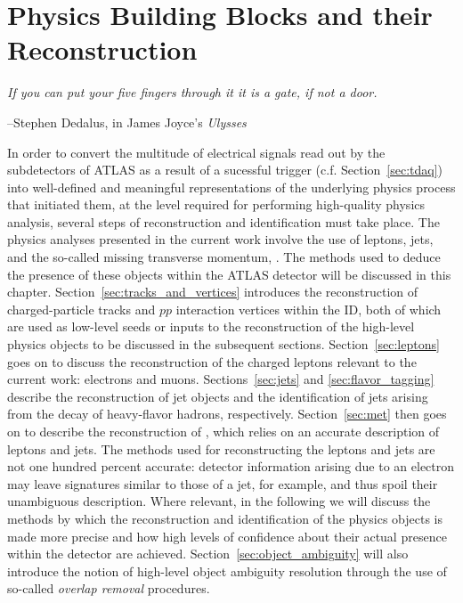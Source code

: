 \chapter{Physics Building Blocks and their Reconstruction}
\label{chap:objects}

\epigraph{\textit{If you can put your five fingers through it it is a gate, if not a door.}}{--Stephen Dedalus, in James Joyce's \textit{Ulysses}}

In order to convert the multitude of electrical signals read out by the subdetectors
of ATLAS as a result of a sucessful trigger (c.f. Section~\ref{sec:tdaq})
into well-defined and meaningful representations of the underlying physics process
that initiated them, at the level required for performing high-quality physics analysis,
several steps of reconstruction and identification must take place.
The physics analyses presented in the current work involve the use of leptons,
jets, and the so-called missing transverse momentum, \ptmiss.
The methods used to deduce the presence of these objects within the ATLAS detector
will be discussed in this chapter.
Section~\ref{sec:tracks_and_vertices} introduces the reconstruction of charged-particle
tracks and $pp$ interaction vertices within the ID, both of which are used as low-level seeds or inputs to the
reconstruction of the high-level physics objects to be discussed in the subsequent
sections.
Section~\ref{sec:leptons} goes on to discuss the reconstruction of the charged leptons
relevant to the current work: electrons and muons.
Sections~\ref{sec:jets} and \ref{sec:flavor_tagging} describe the reconstruction
of jet objects and the identification of jets arising from the decay of heavy-flavor hadrons,
respectively.
Section~\ref{sec:met} then goes on to describe the reconstruction of \ptmiss,
which relies on an accurate description of leptons and jets.
The methods used for reconstructing the leptons and jets are not one hundred percent
accurate: detector information arising due to an electron may leave signatures
similar to those of a jet, for example, and thus spoil their unambiguous description.
Where relevant, in the following we will discuss the methods by which the reconstruction
and identification of the physics objects is made more precise and how high levels
of confidence about their actual presence within the detector are achieved.
Section~\ref{sec:object_ambiguity} will also introduce the notion of high-level
object ambiguity resolution through the use of so-called \textit{overlap removal}
procedures.



